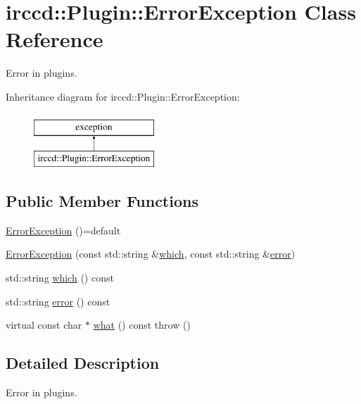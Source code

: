 \hypertarget{a00027}{\section{irccd\-:\-:Plugin\-:\-:Error\-Exception Class Reference}
\label{a00027}
}


Error in plugins.  


Inheritance diagram for irccd\-:\-:Plugin\-:\-:Error\-Exception\-:\begin{figure}[H]
\begin{center}
\leavevmode
\includegraphics[height=2.000000cm]{a00027}
\end{center}
\end{figure}
\subsection*{Public Member Functions}
\begin{DoxyCompactItemize}
\item 
\hyperlink{a00027_a8058a7e729626a7d493229289510df58}{Error\-Exception} ()=default
\item 
\hyperlink{a00027_acd214ef534f5be7610b14767bd4047d2}{Error\-Exception} (const std\-::string \&\hyperlink{a00027_ad0393095907915c201b25e8644d3697c}{which}, const std\-::string \&\hyperlink{a00027_a9450d24147677c302d13221d01c86db1}{error})
\item 
std\-::string \hyperlink{a00027_ad0393095907915c201b25e8644d3697c}{which} () const 
\item 
std\-::string \hyperlink{a00027_a9450d24147677c302d13221d01c86db1}{error} () const 
\item 
virtual const char $\ast$ \hyperlink{a00027_af9e51fd0f4b4a50cc4aba81f44dd4f9f}{what} () const   throw ()
\end{DoxyCompactItemize}


\subsection{Detailed Description}
Error in plugins. 

